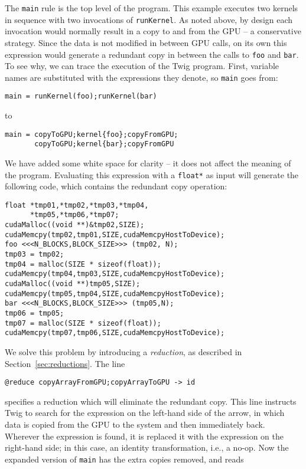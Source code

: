 The \texttt{main} rule is the top level of the program. This example executes two kernels in sequence with two invocations of \texttt{runKernel}. As noted above, by design each invocation would normally result in a copy to and from the GPU -- a conservative strategy. Since the data is not modified in between GPU calls, on its own this expression would generate a redundant copy in between the calls to \texttt{foo} and \texttt{bar}. To see why, we can trace the execution of the Twig program. First, variable names are substituted with the expressions they denote, so \texttt{main} goes from:

\begin{verbatim}
main = runKernel(foo);runKernel(bar)
\end{verbatim}

to 

\begin{verbatim}
main = copyToGPU;kernel{foo};copyFromGPU;
       copyToGPU;kernel{bar};copyFromGPU
\end{verbatim}

We have added some white space for clarity -- it does not affect the meaning of the program. Evaluating this expression with a \texttt{float*} as input will generate the following code, which contains the redundant copy operation:

\begin{verbatim}
float *tmp01,*tmp02,*tmp03,*tmp04,
      *tmp05,*tmp06,*tmp07;
cudaMalloc((void **)&tmp02,SIZE);
cudaMemcpy(tmp02,tmp01,SIZE,cudaMemcpyHostToDevice);
foo <<<N_BLOCKS,BLOCK_SIZE>>> (tmp02, N);
tmp03 = tmp02;
tmp04 = malloc(SIZE * sizeof(float));
cudaMemcpy(tmp04,tmp03,SIZE,cudaMemcpyHostToDevice);
cudaMalloc((void **)tmp05,SIZE);
cudaMemcpy(tmp05,tmp04,SIZE,cudaMemcpyHostToDevice);
bar <<<N_BLOCKS,BLOCK_SIZE>>> (tmp05,N);
tmp06 = tmp05;
tmp07 = malloc(SIZE * sizeof(float));
cudaMemcpy(tmp07,tmp06,SIZE,cudaMemcpyHostToDevice);
\end{verbatim}

We solve this problem by introducing a \emph{reduction}, as described in Section~\ref{sec:reductions}. The line

\begin{verbatim}
@reduce copyArrayFromGPU;copyArrayToGPU -> id
\end{verbatim}

specifies a reduction which will eliminate the redundant copy. This line instructs Twig to search for the expression on the left-hand side of the arrow, in which data is copied from the GPU to the system and then immediately back. Wherever the expression is found, it is replaced it with the expression on the right-hand side; in this case, an identity transformation, i.e., a no-op. Now the expanded version of \texttt{main} has the extra copies removed, and reads

